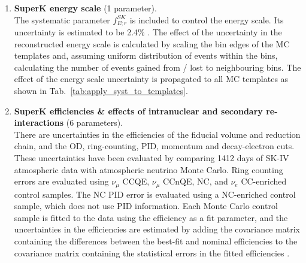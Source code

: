 \begin{enumerate}

\item 
{\bf SuperK energy scale} (1 parameter).\\
The systematic parameter $f_{E; r}^{SK}$ is included to control the energy scale.
Its uncertainty is estimated to be 2.4\% \cite{SuperkEScale2013}.
The effect of the uncertainty in the reconstructed energy scale is calculated by scaling the bin edges of
the MC templates and, assuming uniform distribution of events within the bins, calculating the number
of events gained from / lost to neighbouring bins. 
The effect of the energy scale uncertainty is propagated to all MC templates as shown in Tab.\ \ref{tab:apply_syst_to_templates}.\\

\item 
{\bf SuperK efficiencies \& effects of intranuclear and secondary re-interactions} (6 parameters).\\
There are uncertainties in the efficiencies of the fiducial volume and reduction chain, 
and the OD, ring-counting, PID, momentum and decay-electron cuts.
These uncertainties have been evaluated by comparing 1412 days of SK-IV atmospheric data
with atmospheric neutrino Monte Carlo.
Ring counting errors are evaluated using $\nu_\mu$ CCQE, $\nu_\mu$ CCnQE, NC, and $\nu_e$ CC-enriched control samples.
The NC PID error is evaluated using a NC-enriched control sample, which
does not use PID information.
Each Monte Carlo control sample is fitted to the data using the efficiency as a fit parameter, and the uncertainties in the 
efficiencies are estimated by adding the covariance matrix containing the differences between the best-fit and nominal efficiencies to 
the covariance matrix containing the statistical errors in the fitted efficiencies \cite{SuperkErrors2013}.


\end{enumerate}
